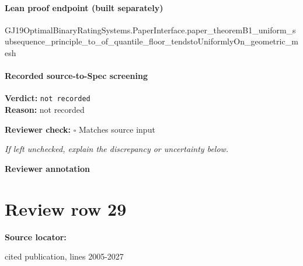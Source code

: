 \documentclass[10pt]{article}
\newcommand{\reviewerbox}{%
  \par\noindent\fbox{\parbox{0.96\linewidth}{\rule{0pt}{0.38in}}}\par
}
\newcommand{\reviewmatch}[1]{%
  \par\noindent\textbf{Reviewer check:} $\square$\; #1\par
  \noindent\emph{If left unchecked, explain the discrepancy or uncertainty below.}\par
}
\begin{document}
\paragraph{Lean proof endpoint (built separately)}\begin{ReviewVerbatim}
GJ19OptimalBinaryRatingSystems.PaperInterface.paper_theoremB1_uniform_subsequence_principle_to_of_quantile_floor_tendstoUniformlyOn_geometric_mesh
\end{ReviewVerbatim}

\paragraph{Recorded source-to-Spec screening}
\textbf{Verdict:} \texttt{not recorded}
\\
\textbf{Reason:} not recorded
\reviewmatch{Matches source input}
\noindent\textbf{Reviewer annotation}\par
\reviewerbox
\clearpage
\hypertarget{source-claim-c34337b3884bb5d6}{}
\section*{Review row 29}
\textbf{Source locator:} {\footnotesize\raggedright cited publication, lines 2005-\allowbreak{}2027\par}
\end{document}
